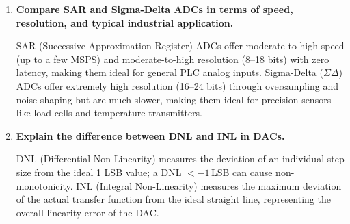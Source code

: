 \documentclass[12pt,a4paper]{article}
\newcommand{\Q}[1]{\textbf{#1}\par\noindent\ignorespaces}
\begin{document}
\begin{tcolorbox}[exambox, title={\textbf{Frequently Asked / Viva Questions}}]
\begin{enumerate}[leftmargin=*, itemsep=4pt]
  \item \Q{Compare SAR and Sigma-Delta ADCs in terms of speed, resolution, and typical industrial application.}
    SAR (Successive Approximation Register) ADCs offer moderate-to-high speed (up to a few MSPS) and moderate-to-high resolution (8--18 bits) with zero latency, making them ideal for general PLC analog inputs. Sigma-Delta ($\Sigma\Delta$) ADCs offer extremely high resolution (16--24 bits) through oversampling and noise shaping but are much slower, making them ideal for precision sensors like load cells and temperature transmitters.
  \item \Q{Explain the difference between DNL and INL in DACs.}
    DNL (Differential Non-Linearity) measures the deviation of an individual step size from the ideal 1 LSB value; a DNL $< -1\,$LSB can cause non-monotonicity. INL (Integral Non-Linearity) measures the maximum deviation of the actual transfer function from the ideal straight line, representing the overall linearity error of the DAC.
\end{enumerate}
\end{tcolorbox}
\end{document}

